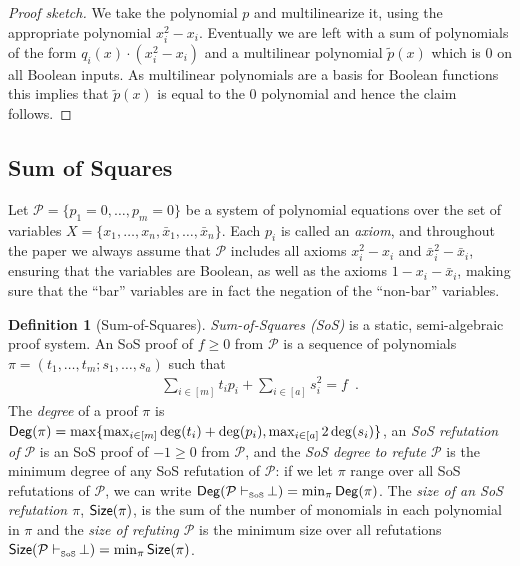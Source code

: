 \documentclass[10pt,a4paper]{article}
\theoremstyle{plain}
\theoremstyle{remark}
\theoremstyle{definition}
\newtheorem{definition}[theorem]{Definition}
\newcommand{\eqperiod}{\enspace .}
\newcommand{\set}[1]{\{#1\}}
\newcommand{\calP}{\mathcal{P}}
\DeclareMathOperator{\Deg}{\sf{Deg}}
\DeclareMathOperator{\Size}{\sf{Size}}
\newcommand{\RefuteDeg}[2]{\Deg(#2 \vdash_{\text{\tiny #1}} \, \perp)}
\newcommand{\RefuteSize}[2]{\Size(#2 \vdash_{\text{\tiny #1}} \, \perp)}
\begin{document}
\begin{proof}[Proof sketch]
  We take the polynomial $p$ and multilinearize it, using the
  appropriate polynomial $x_i^2 - x_i$. Eventually we are left with a
  sum of polynomials of the form $q_i(x)\cdot(x_i^2 - x_i)$ and a
  multilinear polynomial $\tilde p(x)$ which is $0$ on all Boolean
  inputs.  As multilinear polynomials are a basis for Boolean
  functions this implies that $\tilde p(x)$ is equal to the $0$
  polynomial and hence the claim follows.
\end{proof}

\subsection{Sum of Squares}
\label{sec:known-SoS-results}

Let $\calP = \set{p_1 = 0, \ldots, p_m = 0}$ be a system of polynomial
equations over the set of variables
$X = \set{x_1, \ldots, x_n, \bar{x}_1, \ldots, \bar{x}_n}$.  Each
$p_i$ is called an \emph{axiom}, and throughout the paper we always
assume that $\calP$ includes all axioms $x_i^2 - x_i$ and
$\bar{x}_i^2 - \bar{x}_i$, ensuring that the variables are Boolean, as
well as the axioms $1 - x_i - \bar{x}_i$, making sure that the ``bar''
variables are in fact the negation of the ``non-bar'' variables.

%

\begin{definition}[Sum-of-Squares]
  \emph{Sum-of-Squares (SoS)} is a static, semi-algebraic proof
  system. An SoS proof of $f \ge 0$ from $\calP$ is a sequence of
  polynomials $\pi = (t_1, \ldots, t_m; s_1, \ldots, s_a)$ such that
  \begin{align*}
    \sum_{i \in [m]} t_i p_i +
    \sum_{i \in [a]} s^2_i = f \eqperiod %
  \end{align*}
  The \emph{degree} of a proof $\pi$ is
  $\Deg(\pi) = \max \set{ \max_{i \in [m]} \deg(t_i) + \deg(p_i),
    \max_{i \in [a]} 2 \deg(s_i) }$, an \emph{SoS refutation of
    $\calP$} is an SoS proof of $-1 \ge 0$ from $\calP$, and the
  \emph{SoS degree to refute $\calP$} is the minimum degree of any SoS
  refutation of $\calP$: if we let $\pi$ range over all SoS
  refutations of $\calP$, we can write
  $\RefuteDeg{SoS}{\calP} = \min_\pi \Deg(\pi)$.  The \emph{size of an
    SoS refutation $\pi$}, $\Size(\pi)$, is the sum of the number of
  monomials in each polynomial in $\pi$ and the \emph{size of refuting
    $\calP$} is the minimum size over all refutations
  $\RefuteSize{SoS}{\calP} = \min_{\pi} \Size(\pi)$.
\end{definition}
\end{document}
